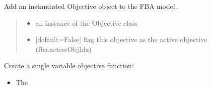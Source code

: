 \documentclass[letterpaper,12pt,english]{sphinxmanual}
\begin{document}
\begin{fulllineitems}
\begin{fulllineitems}
\end{fulllineitems}


\begin{fulllineitems}
\label{\detokenize{api/core:cbmpy.CBModel.Model.addObjective}}
\pysigstartsignatures
\pysiglinewithargsret
{}
{\sphinxparamcomma {}}
{}
\pysigstopsignatures
\sphinxAtStartPar
Add an instantiated Objective object to the FBA model.
\begin{quote}\begin{description}
\begin{itemize}
\item {} 
\sphinxAtStartPar
{} \textendash{} an instance of the Objective class

\item {} 
\sphinxAtStartPar
{} \textendash{} {[}default=False{]} flag this objective as the active objective (fba.activeObjIdx)

\end{itemize}

\end{description}\end{quote}

\end{fulllineitems}


\begin{fulllineitems}
\label{\detokenize{api/core:cbmpy.CBModel.Model.createObjectiveFunction}}
\pysigstartsignatures
\pysiglinewithargsret
{}
{\sphinxparamcomma {}\sphinxparamcomma {}\sphinxparamcomma {}\sphinxparamcomma {}}
{}
\pysigstopsignatures
\sphinxAtStartPar
Create a single variable objective function:
\begin{itemize}
\item {} 
\sphinxAtStartPar
{} The


\end{itemize}
\end{fulllineitems}
\end{fulllineitems}
\end{document}
